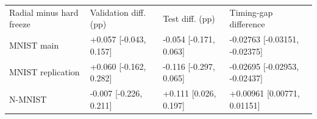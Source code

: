 \begin{tabular}{llll}
\hline
Radial minus hard freeze & Validation diff. (pp) & Test diff. (pp) & Timing-gap difference \\
MNIST main & +0.057 [-0.043, 0.157] & -0.054 [-0.171, 0.063] & -0.02763 [-0.03151, -0.02375] \\
MNIST replication & +0.060 [-0.162, 0.282] & -0.116 [-0.297, 0.065] & -0.02695 [-0.02953, -0.02437] \\
N-MNIST & -0.007 [-0.226, 0.211] & +0.111 [0.026, 0.197] & +0.00961 [0.00771, 0.01151] \\
\hline
\end{tabular}

